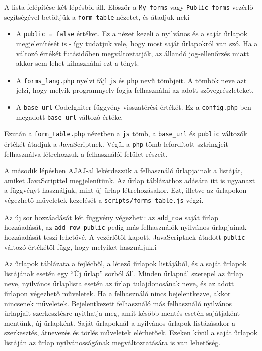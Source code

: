 \documentclass[12pt,a4paper,twoside]{article}
\begin{document}
A lista felépítése két lépésből áll. Először a \texttt{My\_forms} vagy
\texttt{Public\_forms} vezérlő
segítségével betöltjük a \texttt{form\_table} nézetet, és átadjuk neki
\begin{itemize}
\item A \texttt{public = false} értéket. Ez a nézet kezeli a nyilvános és a
  saját űrlapok megjelenítését is - így tudatjuk vele, hogy most saját
  űrlapokról van szó. Ha a változó értékét futásidőben megváltoztatják, az
  állandó jog-ellenőrzés miatt akkor sem lehet kihasználni ezt a tényt.
\item A \texttt{forms\_lang.php} nyelvi fájl \texttt{js} és \texttt{php} nevű
  tömbjeit. A tömbök neve azt jelzi, hogy melyik programnyelv fogja felhasználni
  az adott szövegrészleteket.
\item A \texttt{base\_url} CodeIgniter függvény visszatérési értékét. Ez a
  \texttt{config.php}-ben megadott \texttt{base\_url} változó értéke.
\end{itemize}

Ezután a \texttt{form\_table.php} nézetben a \texttt{js} tömb, a
\texttt{base\_url} és \texttt{public} változók értékét átadjuk a
JavaScriptnek. Végül a \texttt{php} tömb lefordított sztringjeit felhasználva
létrehozzuk a felhasználói felület részeit.

\vspace{1cm}

A második lépésben AJAJ-al lekérdezzük a felhasználó űrlapjainak
a listáját, amiket JavaScripttel megjelenítünk. Az űrlap táblázathoz adására
itt is ugyanazt a függvényt használjuk, mint új űrlap létrehozásakor. Ezt,
illetve az űrlapokon végezhető műveletek kezelését a
\texttt{scripts/forms\_table.js} végzi.

Az új sor hozzáadását két függvény végezheti: az \texttt{add\_row} saját űrlap
hozzáadását, az \texttt{add\_row\_public} pedig más felhasználók nyilvános
űrlapjainak hozzáadását teszi lehetővé. A vezérlőtől kapott, JavaScriptnek
átadott \texttt{public} változó értékétől függ, hogy melyiket használjuk.i

Az űrlapok táblázata a fejlécből, a létező űrlapok listájából, és a saját
űrlapok listájának esetén egy ``Új űrlap'' sorból áll. Minden űrlapnál szerepel
az űrlap neve, nyilvános űrlaplista esetén az űrlap tulajdonosának neve, és az
adott űrlapon végezhető műveletek. Ha a felhasználó nincs bejelentkezve, akkor
nincsenek műveletek. Bejelentkezett felhasználó más felhasználó nyilvános űrlapjait
szerkesztésre nyithatja meg, amit később mentés esetén sajátjaként mentünk, új
űrlapként. Saját űrlapoknál a nyilvános űrlapok listázásakor a szerkesztés,
átnevezés és törlés műveletek elérhetőek. Ezeken kívül a saját űrlapok listáján
az űrlap nyilvánosságának megváltoztatására is van lehetőség.
\end{document}
